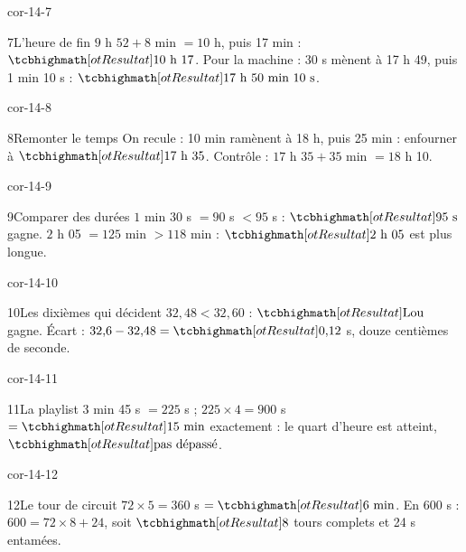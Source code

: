 \begin{blocLivre}{cor-14-7}\begin{corrige}{7}{L’heure de fin}
$9$ h $52+8$ min $=10$ h, puis 17 min : $\res{10\ \text h\ 17}$. Pour la machine : 30 s mènent à 17 h 49, puis 1 min 10 s : $\res{17\ \text h\ 50\ \text{min}\ 10\ \text s}$.
\end{corrige}\end{blocLivre}
\begin{blocLivre}{cor-14-8}\begin{corrige}{8}{Remonter le temps}
On recule : 10 min ramènent à 18 h, puis 25 min : enfourner à $\res{17\ \text h\ 35}$. Contrôle : $17$ h $35+35$ min $=18$ h 10.
\end{corrige}\end{blocLivre}
\begin{blocLivre}{cor-14-9}\begin{corrige}{9}{Comparer des durées}
$1$ min 30 s $=90$ s $<95$ s : $\res{95\ \text s}$ gagne. $2$ h 05 $=125$ min $>118$ min : $\res{2\ \text h\ 05}$ est plus longue.
\end{corrige}\end{blocLivre}
\begin{blocLivre}{cor-14-10}\begin{corrige}{10}{Les dixièmes qui décident}
$32{,}48<32{,}60$ : $\res{\text{Lou}}$ gagne. Écart : $32{,}6-32{,}48=\res{0{,}12}$ s, douze centièmes de seconde.
\end{corrige}\end{blocLivre}
\begin{blocLivre}{cor-14-11}\begin{corrige}{11}{La playlist}
$3$ min 45 s $=225$ s ; $225\times4=900$ s $=\res{15\ \text{min}}$ exactement : le quart d’heure est atteint, $\res{\text{pas dépassé}}$.
\end{corrige}\end{blocLivre}
\begin{blocLivre}{cor-14-12}\begin{corrige}{12}{Le tour de circuit}
$72\times5=360$ s $=\res{6\ \text{min}}$. En 600 s : $600=72\times8+24$, soit $\res8$ tours complets et 24 s entamées.
\end{corrige}\end{blocLivre}
